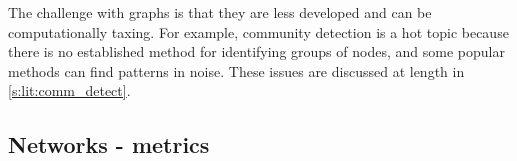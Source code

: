 The challenge with graphs is that they are less developed and can be computationally taxing. For example, community detection is a hot topic because there is no established method for identifying groups of nodes, and some popular methods can find patterns in noise. These issues are discussed at length in \cref{s:lit:comm_detect}.

\subsection{Networks - metrics} \label{s:lit:networks_metrics}
